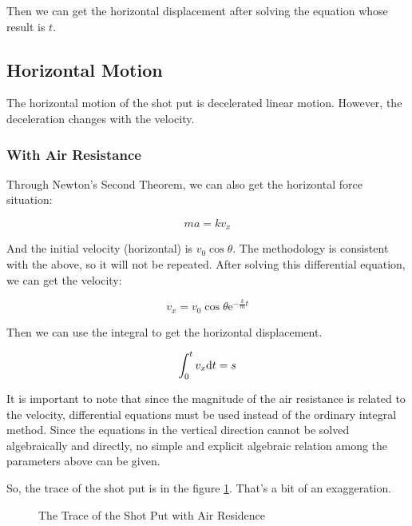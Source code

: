 \documentclass{article}
\begin{document}
Then we can get the horizontal displacement after solving the equation whose result is $t$.

\subsection{Horizontal Motion}

The horizontal motion of the shot put is decelerated linear motion. However, the deceleration changes with the velocity.

\subsubsection{With Air Resistance}

Through Newton's Second Theorem, we can also get the horizontal force situation:

\begin{equation*}
    ma = kv_x
\end{equation*}

And the initial velocity (horizontal) is $v_0\cos\theta$. The methodology is consistent with the above, so it will not be repeated. After solving this differential equation, we can get the velocity:

\begin{equation}
    v_x=v_0\cos\theta\mathrm{e}^{-\frac{k}{m}t}
\end{equation}

Then we can use the integral to get the horizontal displacement.

\begin{equation}
    \int^t_0v_x\mathrm{d} t=s
\end{equation}

It is important to note that since the magnitude of the air resistance is related to the velocity, differential equations must be used instead of the ordinary integral method. Since the equations in the vertical direction cannot be solved algebraically and directly, no simple and explicit algebraic relation among the parameters above can be given.

So, the trace of the shot put is in the figure \ref{fig:trace-with-residence}. That's a bit of an exaggeration.

\begin{figure}[H]
    \centering
    \caption{The Trace of the Shot Put with Air Residence}
    \label{fig:trace-with-residence}
\end{figure}
\end{document}
